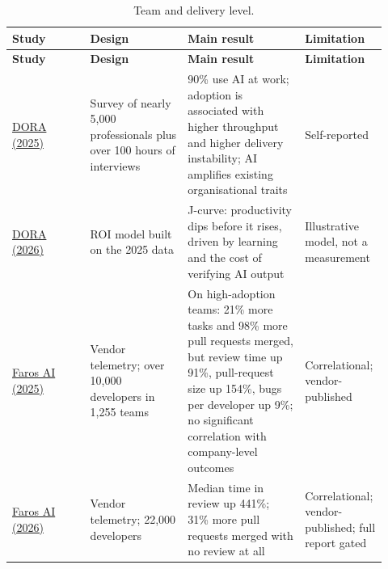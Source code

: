 \documentclass[11pt]{article}
\begin{document}
\small
\begin{longtable}{p{0.2\linewidth}p{0.25\linewidth}p{0.3\linewidth}p{0.17\linewidth}}
\caption{Team and delivery level.}\\
\toprule
\textbf{Study} & \textbf{Design} & \textbf{Main result} & \textbf{Limitation} \\
\midrule
\endfirsthead
\toprule
\textbf{Study} & \textbf{Design} & \textbf{Main result} & \textbf{Limitation} \\
\midrule
\endhead
\href{https://cloud.google.com/blog/products/ai-machine-learning/from-adoption-to-impact-putting-the-dora-ai-capabilities-model-to-work}{DORA (2025)} & Survey of nearly 5,000 professionals plus over 100 hours of interviews & 90\% use AI at work; adoption is associated with higher throughput and higher delivery instability; AI amplifies existing organisational traits & Self-reported \\
\href{https://www.infoq.com/news/2026/05/dora-roi-ai-assisted-dev-report/}{DORA (2026)} & ROI model built on the 2025 data & J-curve: productivity dips before it rises, driven by learning and the cost of verifying AI output & Illustrative model, not a measurement \\
\href{https://243608892.fs1.hubspotusercontent-na2.net/hubfs/243608892/AI_Engineering_Impact_Report_July_2025_Faros_AI.pdf}{Faros AI (2025)} & Vendor telemetry; over 10,000 developers in 1,255 teams & On high-adoption teams: 21\% more tasks and 98\% more pull requests merged, but review time up 91\%, pull-request size up 154\%, bugs per developer up 9\%; no significant correlation with company-level outcomes & Correlational; vendor-published \\
\href{https://www.faros.ai/blog/key-takeaways-from-the-dora-report-2025}{Faros AI (2026)} & Vendor telemetry; 22,000 developers & Median time in review up 441\%; 31\% more pull requests merged with no review at all & Correlational; vendor-published; full report gated \\
\bottomrule
\end{longtable}
\normalsize
\end{document}
